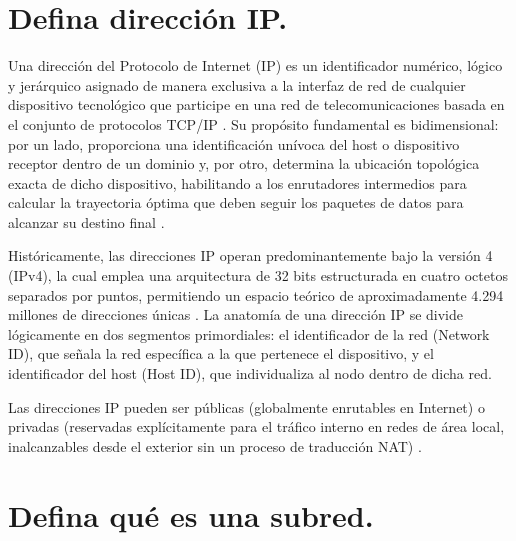 \documentclass[a4paper,12pt]{article}
\begin{document}
\renewcommand{\footrulewidth}{0.4pt}  %

\setcounter{page}{1}

\tableofcontents

\newpage

\section{Defina dirección IP.}

Una dirección del Protocolo de Internet (IP) es un identificador numérico, lógico y jerárquico asignado de manera exclusiva a la interfaz de red de cualquier dispositivo tecnológico que participe en una red de telecomunicaciones basada en el conjunto de protocolos TCP/IP \cite{fortinet_ip}. Su propósito fundamental es bidimensional: por un lado, proporciona una identificación unívoca del host o dispositivo receptor dentro de un dominio y, por otro, determina la ubicación topológica exacta de dicho dispositivo, habilitando a los enrutadores intermedios para calcular la trayectoria óptima que deben seguir los paquetes de datos para alcanzar su destino final \cite{kaspersky_ip}.

Históricamente, las direcciones IP operan predominantemente bajo la versión 4 (IPv4), la cual emplea una arquitectura de 32 bits estructurada en cuatro octetos separados por puntos, permitiendo un espacio teórico de aproximadamente 4.294 millones de direcciones únicas \cite{proofpoint_ip}. La anatomía de una dirección IP se divide lógicamente en dos segmentos primordiales: el identificador de la red (Network ID), que señala la red específica a la que pertenece el dispositivo, y el identificador del host (Host ID), que individualiza al nodo dentro de dicha red.

Las direcciones IP pueden ser públicas (globalmente enrutables en Internet) o privadas (reservadas explícitamente para el tráfico interno en redes de área local, inalcanzables desde el exterior sin un proceso de traducción NAT) \cite{fortinet_ip}.

\newpage

\section{Defina qué es una subred.}
\end{document}

